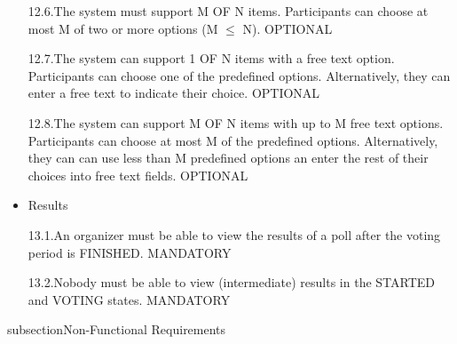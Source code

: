 \begin{itemize}
12.6.The system must support M OF N items. Participants can choose at most M of two or
more options (M $\leq$ N). OPTIONAL


12.7.The system can support 1 OF N items with a free text option. Participants can choose one
of the predefined options. Alternatively, they can enter a free text to indicate their choice.
OPTIONAL


12.8.The system can support M OF N items with up to M free text options. Participants can
choose at most M of the predefined options. Alternatively, they can can use less than M
predefined options an enter the rest of their choices into free text fields. OPTIONAL


\item Results


13.1.An organizer must be able to view the results of a poll after the voting period is FINISHED.
MANDATORY


13.2.Nobody must be able to view (intermediate) results in the STARTED and VOTING states.
MANDATORY

\end{itemize}

subsection{Non-Functional Requirements}
